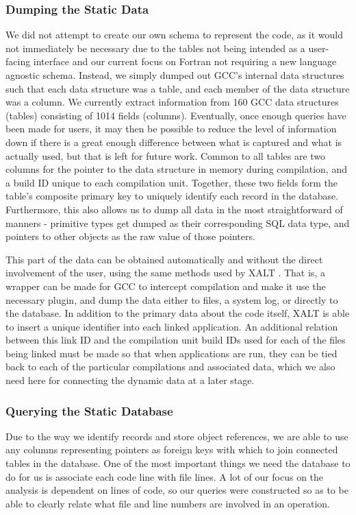 \subsubsection{Dumping the Static Data}
We did not attempt to create our own schema to represent the code, as it would not immediately be necessary due to the tables not being intended as a user-facing interface and our current focus on Fortran not requiring a new language agnostic schema.
Instead, we simply dumped out \ac{GCC}'s internal data structures such that each data structure was a table, and each member of the data structure was a column.
We currently extract information from 160 \acs{GCC} data structures (tables) consisting of 1014 fields (columns).
Eventually, once enough queries have been made for users, it may then be possible to reduce the level of information down if there is a great enough difference between what is captured and what is actually used, but that is left for future work.
Common to all tables are two columns for the pointer to the data structure in memory during compilation, and a build ID unique to each compilation unit.
Together, these two fields form the table's composite primary key to uniquely identify each record in the database.
Furthermore, this also allows us to dump all data in the most straightforward of manners - primitive types get dumped as their corresponding \acs{SQL} data type, and pointers to other objects as the raw value of those pointers.

This part of the data can be obtained automatically and without the direct involvement of the user, using the same methods used by XALT \cite{7081224}.
That is, a wrapper can be made for \ac{GCC} to intercept compilation and make it use the necessary plugin, and dump the data either to files, a system log, or directly to the database.
In addition to the primary data about the code itself, XALT is able to insert a unique identifier into each linked application.
An additional relation between this link ID and the compilation unit build IDs used for each of the files being linked must be made so that when applications are run, they can be tied back to each of the particular compilations and associated data, which we also need here for connecting the dynamic data at a later stage.
\subsubsection{Querying the Static Database}
Due to the way we identify records and store object references, we are able to use any columns representing pointers as foreign keys with which to join connected tables in the database.
One of the most important things we need the database to do for us is associate each code line with file lines.
A lot of our focus on the analysis is dependent on lines of code, so our queries were constructed so as to be able to clearly relate what file and line numbers are involved in an operation.

